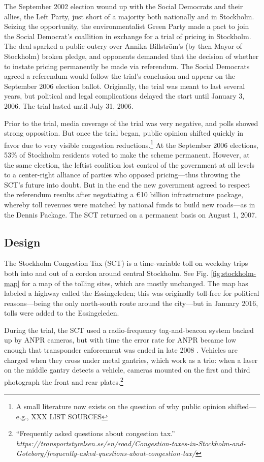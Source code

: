 The September 2002 election wound up with the Social Democrats and their allies, the Left Party, just short of a majority both nationally and in Stockholm. Seizing the opportunity, the environmentalist Green Party made a pact to join the Social Democrat's coallition in exchange for a trial of pricing in Stockholm. The deal sparked a public outcry over Annika Billstr\"om's (by then Mayor of Stockholm) broken pledge, and opponents demanded that the decision of whether to instate pricing permanently be made via referendum. The Social Democrats agreed a referendum would follow the trial's conclusion and appear on the September 2006 election ballot. Originally, the trial was meant to last several years, but political and legal complications delayed the start until January 3, 2006. The trial lasted until July 31, 2006.

Prior to the trial, media coverage of the trial was very negative, and polls showed strong opposition. But once the trial began, public opinion shifted quickly in favor due to very visible congestion reductions.\footnote{A small literature now exists on the question of why public opinion shifted---e.g., XXX LIST SOURCES} At the September 2006 elections, 53\% of Stockholm residents voted to make the scheme permanent. However, at the same election, the leftist coalition lost control of the government at all levels to a center-right alliance of parties who opposed pricing---thus throwing the SCT's future into doubt.  But in the end the new government agreed to respect the referendum results after negotiating a \euro 10 billion infrastructure package, whereby toll revenues were matched by national funds to build new roads---as in the Dennis Package. The SCT returned on a permanent basis on August 1, 2007.

\subsection{Design}

The Stockholm Congestion Tax (SCT) is a time-variable toll on weekday trips both into and out of a cordon around central Stockholm. See Fig. \ref{fig:stockholm-map} for a map of the tolling sites, which are mostly unchanged. The map has labeled a highway called the Essingeleden; this was originally toll-free for political reasons---being the only north-south route around the city---but in January 2016, tolls were added to the Essingeleden.

During the trial, the SCT used a radio-frequency tag-and-beacon system backed up by ANPR cameras, but with time the error rate for ANPR became low enough that transponder enforcement was ended in late 2008 \citep[p. 841]{Hamilton2011}. Vehicles are charged when they cross under metal gantries, which work as a trio: when a laser on the middle gantry detects a vehicle, cameras mounted on the first and third photograph the front and rear plates.\footnote{``Frequently asked questions about congestion tax.'' \emph{https://transportstyrelsen.se/en/road/Congestion-taxes-in-Stockholm-and-Goteborg/frequently-asked-questions-about-congestion-tax/}} 

